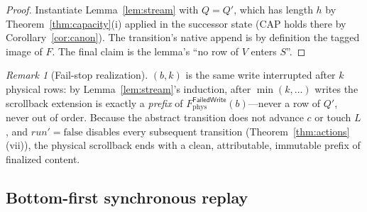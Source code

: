 \documentclass[11pt]{article}
\newcommand{\srcFail}{\mathsf{FailedWrite}}
\newcommand{\Ledger}{L}
\newcommand{\Scr}{Q}
\newcommand{\run}{\mathit{run}}
\newcommand{\act}[1]{\text{\normalfont\scshape #1}}
\theoremstyle{definition}
\theoremstyle{remark}
\newtheorem{remark}[theorem]{Remark}
\begin{document}
\begin{proof}
Instantiate Lemma~\ref{lem:stream} with $Q=\Scr'$, which has length $h$ by
Theorem~\ref{thm:capacity}(i) applied in the successor state (CAP holds there
by Corollary~\ref{cor:canon}). The transition's native append is by
definition the tagged image of $F$. The final claim is the lemma's ``no row of
$V$ enters $S$''.
\end{proof}

\begin{remark}[Fail-stop realization]
\act{RetireFailure}$(b,k)$ is the same write interrupted after $k$ physical
rows: by Lemma~\ref{lem:stream}'s induction, after $\min(k,\dots)$ writes the
scrollback extension is exactly a \emph{prefix} of
$F^{\srcFail}_{\mathrm{phys}}(b)$---never a row of $\Scr'$, never out of
order. Because the abstract transition does not advance $c$ or touch
$\Ledger$, and $\run'=\mathrm{false}$ disables every subsequent transition
(Theorem~\ref{thm:actions}(vii)), the physical scrollback ends with a clean,
attributable, immutable prefix of finalized content.
\end{remark}

\subsection{Bottom-first synchronous replay}\label{sec:replayproof}
\end{document}
